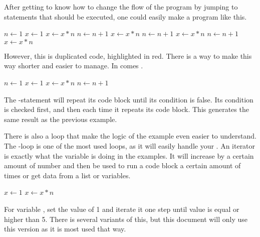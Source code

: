 After getting to know how to change the flow of the program by jumping to statements that should be executed, one could easily make a program like this.

\begin{algorithm}[H]
	\begin{algorithmic}[1]
		\State $n \gets 1$
		\State $x \gets 1$
		\State \textcolor{highlightred}{$x \gets x * n$}
		\State \textcolor{highlightred}{$n \gets n + 1$}
		\State $x \gets x * n$
		\State $n \gets n + 1$
		\State $x \gets x * n$
		\State $n \gets n + 1$
		\State $x \gets x * n$
	\end{algorithmic}
\end{algorithm}

However, this is duplicated code, highlighted in red. There is a way to make this way shorter and easier to manage. In comes .

\begin{algorithm}[H]
	\begin{algorithmic}[1]
		\State $n \gets 1$
		\State $x \gets 1$
			\State $x \gets x * n$
			\State $n \gets n + 1$
		\EndWhile
	\end{algorithmic}
\end{algorithm}

The -statement will repeat its code block until its condition is false. Its condition is checked first, and then each time it repeats its code block. This generates the same result as the previous example.

There is also a loop that make the logic of the example even easier to understand. The -loop is one of the most used loops, as it will easily handle your . An iterator is exactly what the variable  is doing in the examples. It will increase by a certain amount of number and then be used to run a code block a certain amount of times or get data from a list or variables.

\begin{algorithm}[H]
	\begin{algorithmic}[1]
		\State $x \gets 1$
			\State $x \gets x * n$
		\EndFor
	\end{algorithmic}
\end{algorithm}

For variable , set the value of 1 and iterate it one step until value is equal or higher than 5. There is several variants of this, but this document will only use this version as it is most used that way.

